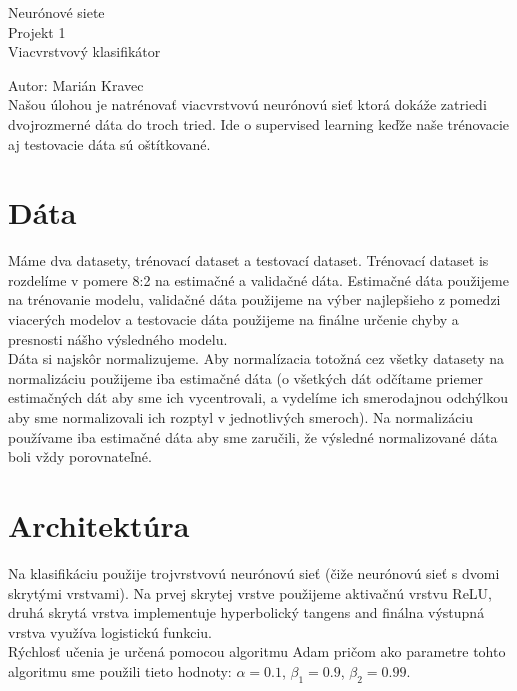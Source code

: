 \documentclass[a4paper]{article}
\begin{document}
 
	
	\pagestyle{plain}
	
	\begin{center}
		\sc\large
		Neurónové siete\\
		Projekt 1\\
		Viacvrstvový klasifikátor 
	\end{center}
	
	Autor: Marián Kravec
	\\
	
	Našou úlohou je natrénovať viacvrstvovú neurónovú sieť ktorá dokáže zatriedi dvojrozmerné dáta do troch tried. Ide o supervised learning keďže naše trénovacie aj testovacie dáta sú oštítkované. 
	\\
	
	\section{Dáta}
	
	Máme dva datasety, trénovací dataset a testovací dataset. Trénovací dataset is rozdelíme v pomere 8:2 na estimačné a validačné dáta. Estimačné dáta použijeme na trénovanie modelu, validačné dáta použijeme na výber najlepšieho z pomedzi viacerých modelov a testovacie dáta použijeme na finálne určenie chyby a presnosti nášho výsledného modelu.
	\\
	
	Dáta si najskôr normalizujeme. Aby normalízacia totožná cez všetky datasety na normalizáciu použijeme iba estimačné dáta (o všetkých dát odčítame priemer estimačných dát aby sme ich vycentrovali, a vydelíme ich smerodajnou odchýlkou aby sme normalizovali ich rozptyl v jednotlivých smeroch). Na normalizáciu používame iba estimačné dáta aby sme zaručili, že výsledné normalizované dáta boli vždy porovnateľné. 
	
	\section{Architektúra}
	
	Na klasifikáciu použije trojvrstvovú neurónovú sieť (čiže neurónovú sieť s dvomi skrytými vrstvami). Na prvej skrytej vrstve použijeme aktivačnú vrstvu ReLU, druhá skrytá vrstva implementuje hyperbolický tangens and finálna výstupná vrstva využíva logistickú funkciu.
	\\
	
	Rýchlosť učenia je určená pomocou algoritmu Adam pričom ako parametre tohto algoritmu sme použili tieto hodnoty: $\alpha=0.1$, $\beta_1=0.9$, $\beta_2=0.99$. 
	\\
	
\end{document}
